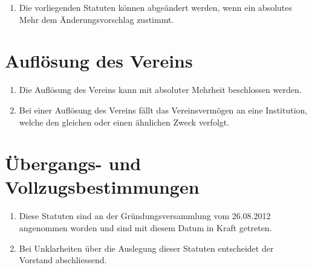 \documentclass[10pt,a4paper,parskip,fleqn]{scrartcl}
\newcommand{\ol}{\begin{enumerate}[itemsep=-0.2em,topsep=-0.2em]}
\newcommand{\lo}{\end{enumerate}}
\newcommand{\li}{\item}
\begin{document}
\ol
	\li Die vorliegenden Statuten können abgeändert werden, wenn ein absolutes
	Mehr dem Änderungsvorschlag zustimmt.
\lo


\section{Auflösung des Vereins}

\ol
	\li Die Auflösung des Vereins kann mit absoluter Mehrheit beschlossen werden.
	\li Bei einer Auflösung des Vereins fällt das Vereinsvermögen an eine
	Institution, welche den gleichen oder einen ähnlichen Zweck verfolgt.
\lo


\section{Übergangs- und Vollzugsbestimmungen}

\ol
	\li Diese Statuten sind an der Gründungsversammlung vom 26.08.2012 angenommen
	worden und sind mit diesem Datum in Kraft getreten.
	\li Bei Unklarheiten über die Auslegung dieser Statuten entscheidet der
	Vorstand abschliessend.
\lo
\end{document}
